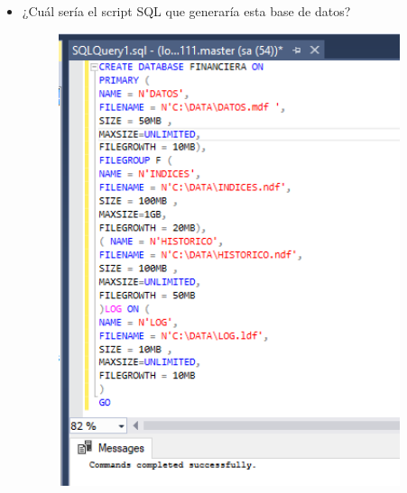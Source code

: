 \begin{itemize}
\begin{figure}[H]
\begin{center}
		\end{center}
		\end{figure} 
		\item  ¿Cuál sería el script SQL que generaría esta base de datos?
\begin{figure}[H]
		\begin{center}
		\includegraphics[width=10cm]{./Imagenes/t4}
		\end{center}
		\end{figure}
	\end{itemize}



